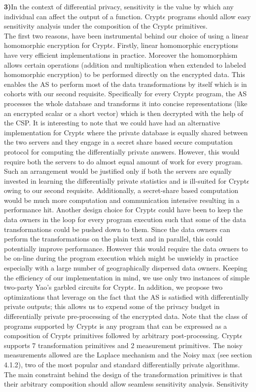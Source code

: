 \textbf{3)}In the context of differential privacy, sensitivity is the value by which any individual can affect the output of a function. Crypt$\epsilon$ programs should allow easy sensitivity analysis under the composition of the Crypt$\epsilon$ primitives. \\
The first two reasons, have been instrumental behind our choice of using a linear homomorphic encryption for Crypt$\epsilon$. Firstly, linear homomorphic encryptions have very efficient implementations in practice. Moreover the homomorphism allows certain operations (addition and multiplication when extended to labeled homomorphic encryption) to be performed directly on the encrypted data. This enables the \textsf{AS} to perform most of the data transformations by itself which is in cohorts with our second requisite. Specifically for every Crypt$\epsilon$ program, the \textsf{AS} processes the whole database and transforms it into concise representations (like an encrypted scalar or a short vector) which is then decrypted with the help of the \textsf{CSP}. It is interesting to note that we could have had an alternative implementation for Crypt$\epsilon$ where the private database is equally shared between the two servers and they engage in a secret share based secure computation protocol for computing the differentially private answers. However, this would require both the servers to do almost equal amount of work for every program. Such an arrangement would be justified only if both the servers are equally invested in learning the differentially private statistics and is ill-suited for Crypt$\epsilon$ owing to our second requisite. Additionally, a secret-share based computation would be much more computation and communication intensive resulting in a performance hit. Another design choice for Crypt$\epsilon$ could have been to keep the data owners in the loop for every program execution such that some of the data transformations could be pushed down to them. Since the data owners can perform the transformations on the plain text and in parallel, this could potentially improve performance. However this would require the data owners to be on-line during the program execution which might be unwieldy in practice especially with a large number of geographically dispersed data owners.  Keeping the efficiency of our implementation in mind, we use only two instances of simple two-party Yao's garbled circuits for Crypt$\epsilon$. In addition, we propose two optimizations that leverage on the fact that the AS is satisfied with differentially private outputs; this allows  us to expend some of the privacy budget in differentially private pre-processing of the encrypted data. Note that the class of programs supported by Crypt$\epsilon$ is any program that can be expressed as a composition of  Crypt$\epsilon$ primitives followed by arbitrary post-processing. Crypt$\epsilon$ supports 7 transformation primitives and 2 measurement primitives. The noisy measurements allowed are the Laplace mechanism and the Noisy max (see section 4.1.2), two of the most popular and standard differentially private algorithms. The main constraint behind the design of the transformation primitives is that their arbitrary composition should allow seamless sensitivity analysis.  Sensitivity 